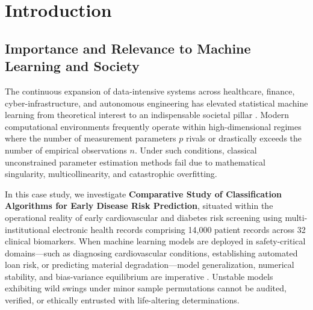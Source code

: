 \section{Introduction}

\subsection{Importance and Relevance to Machine Learning and Society}
The continuous expansion of data-intensive systems across healthcare, finance, cyber-infrastructure, and autonomous engineering has elevated statistical machine learning from theoretical interest to an indispensable societal pillar \cite{hastie2009}. Modern computational environments frequently operate within high-dimensional regimes where the number of measurement parameters $p$ rivals or drastically exceeds the number of empirical observations $n$. Under such conditions, classical unconstrained parameter estimation methods fail due to mathematical singularity, multicollinearity, and catastrophic overfitting.

In this case study, we investigate \textbf{Comparative Study of Classification Algorithms for Early Disease Risk Prediction}, situated within the operational reality of early cardiovascular and diabetes risk screening using multi-institutional electronic health records comprising 14,000 patient records across 32 clinical biomarkers. When machine learning models are deployed in safety-critical domains---such as diagnosing cardiovascular conditions, establishing automated loan risk, or predicting material degradation---model generalization, numerical stability, and bias-variance equilibrium are imperative \cite{breiman2001}. Unstable models exhibiting wild swings under minor sample permutations cannot be audited, verified, or ethically entrusted with life-altering determinations.

